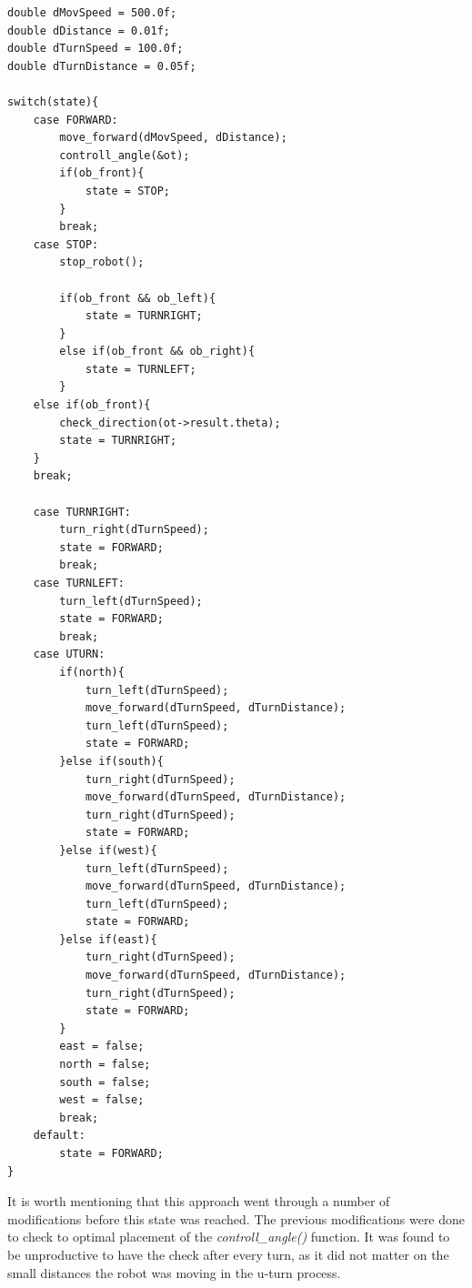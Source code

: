 \begin{lstlisting}[caption={Early Control loop snipped}]
double dMovSpeed = 500.0f;
double dDistance = 0.01f;
double dTurnSpeed = 100.0f;
double dTurnDistance = 0.05f;    

switch(state){
    case FORWARD:
        move_forward(dMovSpeed, dDistance);
        controll_angle(&ot);
        if(ob_front){
            state = STOP;
        }
        break;    
    case STOP:
        stop_robot();

        if(ob_front && ob_left){
            state = TURNRIGHT;
        }
        else if(ob_front && ob_right){
            state = TURNLEFT;
        }
    else if(ob_front){
        check_direction(ot->result.theta);
        state = TURNRIGHT;
    }
    break;    

    case TURNRIGHT:
        turn_right(dTurnSpeed);
        state = FORWARD;
        break;
    case TURNLEFT:
        turn_left(dTurnSpeed);
        state = FORWARD;
        break;
    case UTURN:
        if(north){
            turn_left(dTurnSpeed);
            move_forward(dTurnSpeed, dTurnDistance);
            turn_left(dTurnSpeed);
            state = FORWARD;
        }else if(south){
            turn_right(dTurnSpeed);
            move_forward(dTurnSpeed, dTurnDistance);
            turn_right(dTurnSpeed);
            state = FORWARD;
        }else if(west){
            turn_left(dTurnSpeed);
            move_forward(dTurnSpeed, dTurnDistance);
            turn_left(dTurnSpeed);
            state = FORWARD;
        }else if(east){
            turn_right(dTurnSpeed);
            move_forward(dTurnSpeed, dTurnDistance);
            turn_right(dTurnSpeed);
            state = FORWARD;
        }
        east = false;
        north = false;
        south = false;
        west = false;
        break;
    default:
        state = FORWARD;
}
\end{lstlisting}

It is worth mentioning that this approach went through a number of modifications before this state was reached. The previous modifications were done to check to optimal placement of the \textit{controll\_angle()} function. It was found to be unproductive to have the check after every turn, as it did not matter on the small distances the robot was moving in the u-turn process. \\

